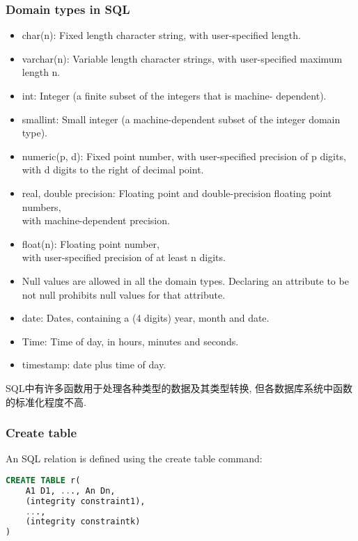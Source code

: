 \subsubsection{Domain types in SQL}

\begin{itemize}
    \item char(n): Fixed length character string, with user-specified length.
    \item varchar(n): Variable length character strings, with user-specified
    maximum length n.
    \item int: Integer (a finite subset of the integers that is machine-
    dependent).
    \item smallint: Small integer (a machine-dependent subset of the integer
    domain type).
    \item numeric(p, d): Fixed point number, with user-specified precision of p
    digits, with d digits to the right of decimal point.
    \item real, double precision: Floating point and double-precision floating point numbers,\\ with machine-dependent precision.
    \item float(n): Floating point number,\\ with user-specified precision of at least n digits.
    \item Null values are allowed in all the domain types. Declaring an
    attribute to be not null prohibits null values for that attribute.
\end{itemize}
\begin{itemize}
    \item date: Dates, containing a (4 digits) year, month and date.
    \item Time: Time of day, in hours, minutes and seconds.
    \item timestamp: date plus time of day.
\end{itemize}


SQL中有许多函数用于处理各种类型的数据及其类型转换, 但各数据库系统中函数的标准化程度不高. 
\subsubsection{Create table}
An SQL relation is defined using the create table command:
\begin{lstlisting}[language=sql]
CREATE TABLE r(
    A1 D1, ..., An Dn,
    (integrity constraint1),
    ...,
    (integrity constraintk)
)
\end{lstlisting}

